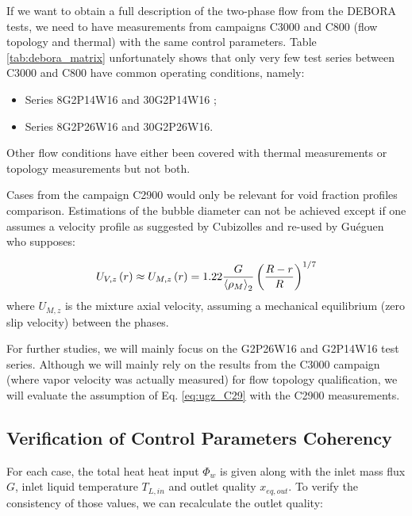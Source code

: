 If we want to obtain a full description of the two-phase flow from the DEBORA tests, we need to have measurements from campaigns C3000 and C800 (flow topology and thermal) with the same control parameters. Table \ref{tab:debora_matrix} unfortunately shows that only very few test series between C3000 and C800 have common operating conditions, namely:

\begin{itemize}
\item Series 8G2P14W16 and 30G2P14W16 ;
\item Series 8G2P26W16 and 30G2P26W16.
\end{itemize}

Other flow conditions have either been covered with thermal measurements or topology measurements but not both. 

\begin{remark*}{}
Cases from the campaign C2900 would only be relevant for void fraction profiles comparison. Estimations of the bubble diameter can not be achieved except if one assumes a velocity profile as suggested by Cubizolles \cite{cubizolles_etude_1996} and re-used by Guéguen \cite{gueguen_contribution_2013} who supposes:

\begin{equation}
U_{V,z}\left( r \right) \approx U_{M,z}\left( r \right) = 1.22 \frac{G}{\left< \rho_{M} \right>_{2}} \left(  \frac{R-r}{R} \right)^{1/7}
\label{eq:ugz_C29}
\end{equation}
where $U_{M,z}$ is the mixture axial velocity, assuming a mechanical equilibrium (\ie zero slip velocity) between the phases.

\end{remark*}


For further studies, we will mainly focus on the G2P26W16 and G2P14W16 test series. Although we will mainly rely on the results from the C3000 campaign (where vapor velocity was actually measured) for flow topology qualification, we will evaluate the assumption of Eq. \ref{eq:ugz_C29} with the C2900 measurements.


\subsection{Verification of Control Parameters Coherency}

For each case, the total heat heat input $\Phi_{w}$ is given along with the inlet mass flux $G$, inlet liquid temperature $T_{L,in}$ and outlet quality $x_{eq,out}$. To verify the consistency of those values, we can recalculate the outlet quality:

